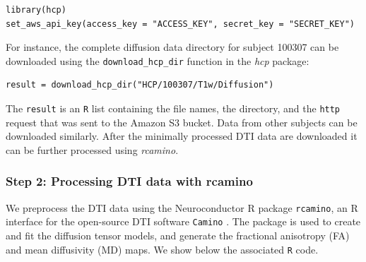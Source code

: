 \documentclass[]{elsarticle} %
\newcommand{\pkg}[1]{\emph{#1}}
\begin{document}
\color{blue}
\begin{verbatim}
library(hcp)
set_aws_api_key(access_key = "ACCESS_KEY", secret_key = "SECRET_KEY")
\end{verbatim}
\color{black}
For instance, the complete diffusion data directory for subject 100307 can be downloaded using the \verb"download_hcp_dir" function in the \pkg{hcp} package:
\color{blue}
\begin{verbatim}
result = download_hcp_dir("HCP/100307/T1w/Diffusion")
\end{verbatim}
\color{black}
The \texttt{result} is an \texttt{R} list containing the file names, the directory, and the \texttt{http} request that was sent to the Amazon S3 bucket. Data from other subjects can be downloaded similarly. After the minimally processed DTI data are downloaded it can be further processed using \pkg{rcamino}. 

\subsubsection{Step 2: Processing DTI data with rcamino}

We preprocess the DTI data using the Neuroconductor R package \texttt{rcamino}, an R interface for the open-source DTI software \texttt{Camino} \citep{camino}. The package is used to create and fit the diffusion tensor models, and generate the fractional anisotropy (FA) and mean diffusivity (MD) maps. We show below the associated \texttt{R} code. 
\end{document}
